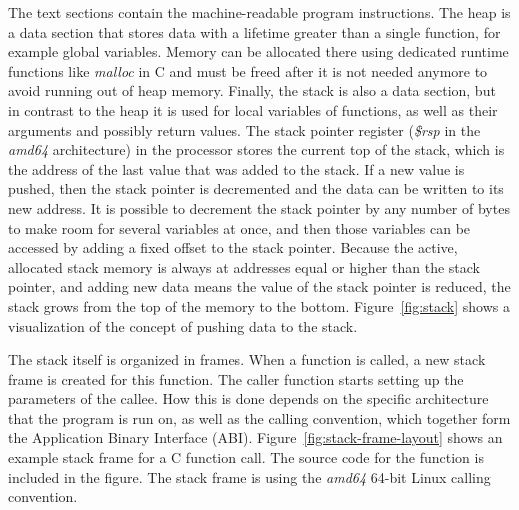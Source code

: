 The text sections contain the machine-readable program instructions.
The heap is a data section that stores data with a lifetime greater than a single function, for example global
variables.
Memory can be allocated there using dedicated runtime functions like \textit{malloc} in C and must be freed after it is
not needed anymore to avoid running out of heap memory.
Finally, the stack is also a data section, but in contrast to the heap it is used for local variables of functions, as
well as their arguments and possibly return values.
The stack pointer register (\textit{\$rsp} in the \textit{amd64} architecture) in the processor stores the current top
of the stack, which is the address of the last value that was added to the stack.
If a new value is pushed, then the stack pointer is decremented and the data can be written to its new address.
It is possible to decrement the stack pointer by any number of bytes to make room for several variables at once, and
then those variables can be accessed by adding a fixed offset to the stack pointer.
Because the active, allocated stack memory is always at addresses equal or higher than the stack pointer, and adding
new data means the value of the stack pointer is reduced, the stack grows from the top of the memory to the bottom.
Figure~\ref{fig:stack} shows a visualization of the concept of pushing data to the stack.



The stack itself is organized in frames.
When a function is called, a new stack frame is created for this function.
The caller function starts setting up the parameters of the callee.
How this is done depends on the specific architecture that the program is run on, as well as the calling convention,
which together form the Application Binary Interface (\acrshort{ABI}).
Figure~\ref{fig:stack-frame-layout} shows an example stack frame for a C function call.
The source code for the function is included in the figure.
The stack frame is using the \textit{amd64} 64-bit Linux calling convention.

